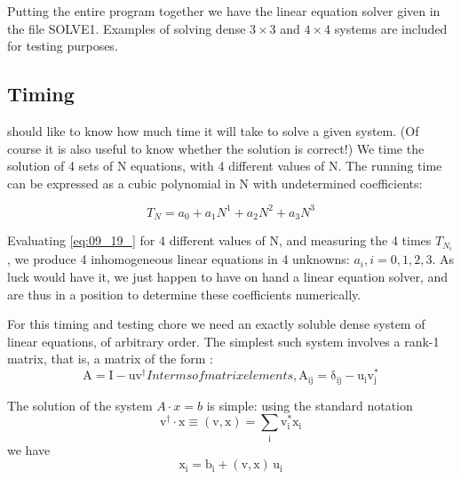 Putting the entire program together we have the linear equation solver given in the file SOLVE1. Examples of solving dense $3\times 3$ and $4\times 4$ systems are included for testing purposes.

\subsection{Timing}
 should like to know how much time it will take to solve a given system. (Of course it is also useful to know whether the solution is correct!) We time the solution of 4 sets of N equations, with 4 different values of N. The running time can be expressed as a cubic polynomial in N with undetermined coefficients:
\addtocounter{equation}{-3} %
\begin{equation}
    T_N=a_0+a_1N^1+a_2N^2+a_3N^3 \label{eq:09_19_}
\end{equation}

Evaluating \ref{eq:09_19_} for 4 different values of N, and measuring the 4
times $T_{N_i}$ , we produce 4 inhomogeneous linear equations in 4 
unknowns: $a_i , i = 0, 1, 2, 3$. As luck would have it, we just happen to have on hand a linear equation solver, and are thus in a
position to determine these coefficients numerically.

For this timing and testing chore we need an exactly soluble dense system of linear equations, of arbitrary order. The simplest such system involves a rank-1 matrix, that is, a matrix of the form :
\begin{subequations}
\begin{equation}
 \label{eq:09_20_}
    \mathrm{A = I - u v^\dagger}
\end{equation}
In terms of matrix elements,

\begin{equation}
 \label{eq:09_20prime_}
    \mathrm{A_{ij} = \delta_{ij} - u_i v_j^*}
\end{equation}
\end{subequations}

The solution of the system $A\cdot x = b$ is simple: using the standard notation
\begin{equation}
 \label{eq:09_21_}
    \mathrm{v^\dagger \cdot x \equiv (v,x) = \sum_{i}v_i^*x_i}
\end{equation}
we have
\begin{equation}
 \label{eq:09_22_}
    \mathrm{x_i = b_i + (v,x)\,u_i}
\end{equation}

